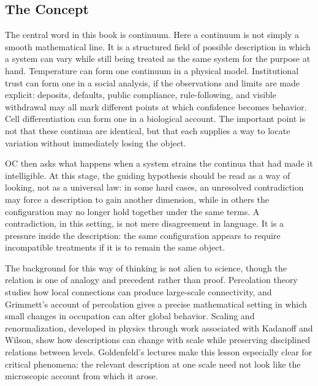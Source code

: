 \documentclass[11pt,a4paper,openany]{book}
\begin{document}
\subsection{The Concept}
The central word in this book is continuum. Here a continuum is not simply a smooth mathematical line. It is a structured field of possible description in which a system can vary while still being treated as the same system for the purpose at hand. Temperature can form one continuum in a physical model. Institutional trust can form one in a social analysis, if the observations and limits are made explicit: deposits, defaults, public compliance, rule-following, and visible withdrawal may all mark different points at which confidence becomes behavior. Cell differentiation can form one in a biological account. The important point is not that these continua are identical, but that each supplies a way to locate variation without immediately losing the object. \cite{grimmett_percolation,goldenfeld_lectures}\par
OC then asks what happens when a system strains the continua that had made it intelligible. At this stage, the guiding hypothesis should be read as a way of looking, not as a universal law: in some hard cases, an unresolved contradiction may force a description to gain another dimension, while in others the configuration may no longer hold together under the same terms. A contradiction, in this setting, is not mere disagreement in language. It is a pressure inside the description: the same configuration appears to require incompatible treatments if it is to remain the same object.\par
The background for this way of thinking is not alien to science, though the relation is one of analogy and precedent rather than proof. Percolation theory studies how local connections can produce large-scale connectivity, and Grimmett's account of percolation gives a precise mathematical setting in which small changes in occupation can alter global behavior. Scaling and renormalization, developed in physics through work associated with Kadanoff and Wilson, show how descriptions can change with scale while preserving disciplined relations between levels. Goldenfeld's lectures make this lesson especially clear for critical phenomena: the relevant description at one scale need not look like the microscopic account from which it arose.\par
\end{document}
